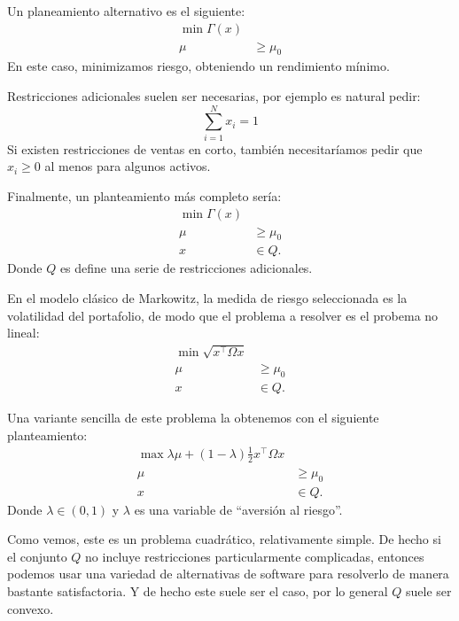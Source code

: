 \documentclass{beamer}
\begin{document}
    \begin{frame}
        Un planeamiento alternativo es el siguiente:
        \begin{align*}
            \min \Gamma(x)&\\
            \mu&\geq \mu_0
        \end{align*}
        En este caso, minimizamos riesgo, obteniendo un rendimiento mínimo.

        Restricciones adicionales suelen ser necesarias, por ejemplo es natural pedir:
        $$
        \sum_{i=1}^{N}x_i=1
        $$
        Si existen restricciones de ventas en corto, también necesitaríamos pedir que $x_i\geq 0$ al menos para algunos activos.
    \end{frame}
    \begin{frame}
        Finalmente, un planteamiento más completo sería:
        \begin{align*}
            \min \Gamma(x)&\\
            \mu&\geq \mu_0\\
            x& \in Q.
        \end{align*}
        Donde $Q$ es define una serie de restricciones adicionales.
        
        En el modelo clásico de Markowitz, la medida de riesgo seleccionada es la volatilidad del portafolio, de modo que el problema a resolver es el probema no lineal:
        \begin{align*}
            \min \sqrt{x^\top \Omega x}&\\
            \mu &\geq \mu_0\\
            x& \in Q.
        \end{align*}
    \end{frame}
    \begin{frame}
        Una variante sencilla de este problema la obtenemos con el siguiente planteamiento:
        \begin{align*}
            \max \lambda \mu + (1-\lambda)\frac{1}{2} x^\top \Omega x&\\
            \mu&\geq \mu_0\\
            x& \in Q.
        \end{align*}
        Donde $\lambda \in (0,1)$ y $\lambda$ es una variable de ``aversión al riesgo''.

        Como vemos, este es un problema cuadrático, relativamente simple. De hecho si el conjunto $Q$ no incluye restricciones particularmente complicadas, entonces podemos usar una variedad de alternativas de software para resolverlo de manera bastante satisfactoria. Y de hecho este suele ser el caso, por lo general $Q$ suele ser convexo.
    \end{frame}
\end{document}
